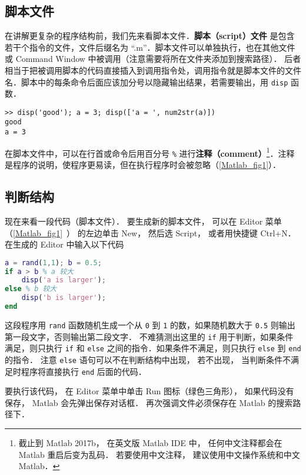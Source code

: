 

\subsection{脚本文件}
在讲解更复杂的程序结构前，我们先来看脚本文件．\textbf{脚本（script）文件} 是包含若干个指令的文件，文件后缀名为 “.m”．脚本文件可以单独执行，也在其他文件或 Command Window 中被调用（注意需要将所在文件夹添加到搜索路径）． 后者相当于把被调用脚本的代码直接插入到调用指令处，调用指令就是脚本文件的文件名．脚本中的每条命令后面应该加分号以隐藏输出结果，若需要输出，用 \verb|disp| 函数．
\begin{lstlisting}[language=matlabC]
>> disp('good'); a = 3; disp(['a = ', num2str(a)])
good
a = 3
\end{lstlisting}
在脚本文件中，可以在行首或命令后用百分号 \verb|%| 进行\textbf{注释（comment）}\footnote{截止到 Matlab 2017b， 在英文版 Matlab IDE 中， 任何中文注释都会在 Matlab 重启后变为乱码． 若要使用中文注释， 建议使用中文操作系统和中文 Matlab．}．注释是程序的说明，使程序更易读，但在执行程序时会被忽略（\autoref{Matlab_fig1}）．

\subsection{判断结构}
现在来看一段代码（脚本文件）． 要生成新的脚本文件， 可以在 Editor 菜单（\autoref{Matlab_fig1}~） 的左边单击 New， 然后选 Script， 或者用快捷键 Ctrl+N． 在生成的 Editor 中输入以下代码

\begin{lstlisting}[language=matlab]
a = rand(1,1); b = 0.5;
if a > b % a 较大
    disp('a is larger');
else % b 较大
    disp('b is larger');
end
\end{lstlisting}

这段程序用 \verb|rand| 函数随机生成一个从 \verb|0| 到 \verb|1| 的数，如果随机数大于 \verb|0.5| 则输出第一段文字，否则输出第二段文字． 不难猜测出这里的 \verb|if| 用于判断，如果条件满足，则只执行 \verb|if| 和 \verb|else| 之间的指令．如果条件不满足，则只执行 \verb|else| 到 \verb|end| 的指令． 注意 \verb|else| 语句可以不在判断结构中出现， 若不出现， 当判断条件不满足时程序将直接执行 \verb|end| 后面的代码．

要执行该代码， 在 Editor 菜单中单击 Run 图标（绿色三角形）， 如果代码没有保存， Matlab 会先弹出保存对话框． 再次强调文件必须保存在 Matlab 的搜索路径下．

